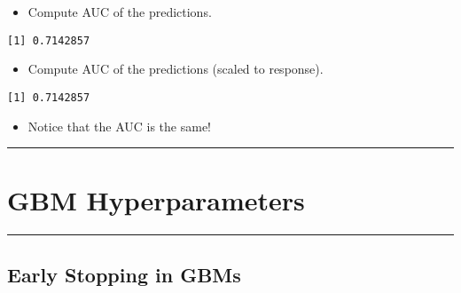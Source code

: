 \documentclass[
]{book}
\newenvironment{Shaded}{\begin{snugshade}}{\end{snugshade}}
\newcommand{\DataTypeTok}[1]{\textcolor[rgb]{0.13,0.29,0.53}{#1}}
\newcommand{\KeywordTok}[1]{\textcolor[rgb]{0.13,0.29,0.53}{\textbf{#1}}}
\newcommand{\NormalTok}[1]{#1}
\newcommand{\OperatorTok}[1]{\textcolor[rgb]{0.81,0.36,0.00}{\textbf{#1}}}
\providecommand{\tightlist}{%
  \setlength{\itemsep}{0pt}\setlength{\parskip}{0pt}}
\begin{document}
\begin{itemize}
\tightlist
\item
  Compute AUC of the predictions.
\end{itemize}

\begin{Shaded}
\end{Shaded}

\begin{verbatim}
[1] 0.7142857
\end{verbatim}

\begin{itemize}
\tightlist
\item
  Compute AUC of the predictions (scaled to response).
\end{itemize}

\begin{Shaded}
\end{Shaded}

\begin{verbatim}
[1] 0.7142857
\end{verbatim}

\begin{itemize}
\tightlist
\item
  Notice that the AUC is the same!
\end{itemize}

\begin{center}\rule{0.5\linewidth}{0.5pt}\end{center}

\hypertarget{gbm-hyperparameters}{%
\section{GBM Hyperparameters}\label{gbm-hyperparameters}}

\begin{center}\rule{0.5\linewidth}{0.5pt}\end{center}

\hypertarget{early-stopping-in-gbms}{%
\subsection{Early Stopping in GBMs}\label{early-stopping-in-gbms}}
\end{document}
